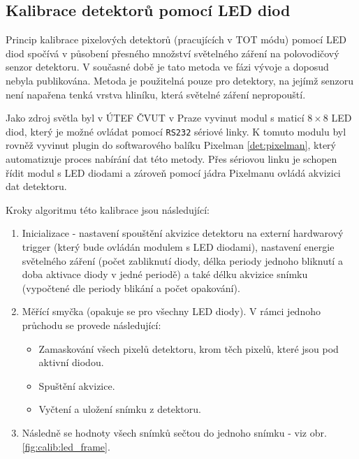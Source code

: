 \subsection{Kalibrace detektorů pomocí LED diod}
Princip kalibrace pixelových detektorů (pracujících v TOT módu) pomocí LED diod spočívá v působení přesného množství světelného záření na polovodičový senzor detektoru. V současné době je tato metoda ve fázi vývoje a doposud nebyla publikována. Metoda je použitelná pouze pro detektory, na jejímž senzoru není napařena tenká vrstva hliníku, která světelné záření nepropouští. 

Jako zdroj světla byl v ÚTEF ČVUT v Praze vyvinut modul s maticí $8\times8$ LED diod, který je možné ovládat pomocí \texttt{RS232} sériové linky. K tomuto modulu byl rovněž vyvinut plugin do softwarového balíku Pixelman \ref{det:pixelman}, který automatizuje proces nabírání dat této metody. Přes sériovou linku je schopen řídit modul s LED diodami a zároveň pomocí jádra Pixelmanu ovládá akvizici dat detektoru.

Kroky algoritmu této kalibrace jsou následující:
\begin{enumerate}
	\item Inicializace - nastavení spouštění akvizice detektoru na externí hardwarový trigger (který bude ovládán modulem s LED diodami), nastavení energie světelného záření (počet zabliknutí diody, délka periody jednoho bliknutí a doba aktivace diody v jedné periodě) a také délku akvizice snímku (vypočtené dle periody blikání a počet opakování).
	\item Měřící smyčka (opakuje se pro všechny LED diody). V rámci jednoho průchodu se provede následující:
		\begin{itemize}
			\item Zamaskování všech pixelů detektoru, krom těch pixelů, které jsou pod aktivní diodou.
			\item Spuštění akvizice.
			\item Vyčtení a uložení snímku z detektoru.
		\end{itemize}
	\item Následně se hodnoty všech snímků sečtou do jednoho snímku - viz obr. \ref{fig:calib:led_frame}.
\end{enumerate}

